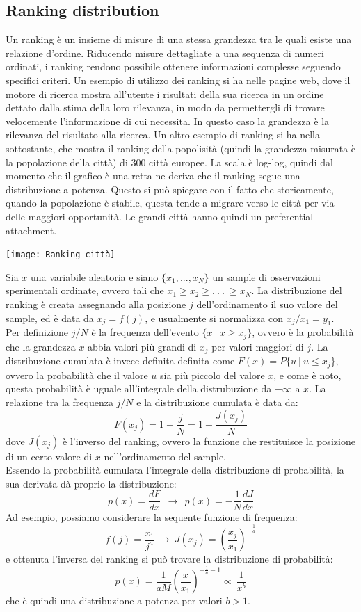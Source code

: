 \documentclass[12pt]{article}
\begin{document}
\subsection{Ranking distribution} 
Un ranking è un insieme di misure di una stessa grandezza tra le quali esiste una relazione d'ordine. Riducendo misure dettagliate a una sequenza di numeri ordinati, i ranking rendono possibile ottenere informazioni complesse seguendo specifici criteri. Un esempio di utilizzo dei ranking si ha nelle pagine web, dove il motore di ricerca mostra all'utente i risultati della sua ricerca in un ordine dettato dalla stima della loro rilevanza, in modo da permettergli di trovare velocemente l'informazione di cui necessita. In questo caso la grandezza è la rilevanza del risultato alla ricerca.
Un altro esempio di ranking si ha nella sottostante, che mostra il ranking della popolisità (quindi la grandezza misurata è la popolazione della città) di 300 città europee. La scala è log-log, quindi dal momento che il grafico è una retta ne deriva che il ranking segue una distribuzione a potenza. Questo si può spiegare con il fatto che storicamente, quando la popolazione è stabile, questa tende a migrare verso le città per via delle maggiori opportunità. Le grandi città hanno quindi un preferential attachment. 
\begin{center}
	\texttt{[image: Ranking città]}
\end{center}
Sia $x$ una variabile aleatoria e siano $\{x_1, . . . , x_N \}$ un sample di osservazioni sperimentali ordinate, ovvero tali che $x_1 \geq x_2 \geq . \ . \ . \ \geq x_N$. La distribuzione del ranking è creata assegnando alla posizione $j$ dell'ordinamento il suo valore del sample, ed è data da $x_j = f(j)$, e usualmente si normalizza con $x_j/x_1 = y_1$. \\
Per definizione $j/N$ è la frequenza dell'evento $\{x \ | \ x \geq x_j\}$, ovvero è la probabilità che la grandezza $x$ abbia valori più grandi di $x_j$ per valori maggiori di $j$. La distribuzione cumulata è invece definita definita come $F(x) = P\{u \ | \ u \leq x_j\}$, ovvero la probabilità che il valore $u$ sia più piccolo del valore $x$, e come è noto, questa probabilità è uguale all'integrale della distrubuzione da $-\infty$ a $x$. La relazione tra la frequenza $j/N$ e la distribuzione cumulata è data da:
$$
	F(x_j) = 1 - \frac{j}{N} = 1 - \frac{J(x_j)}{N}
$$
dove $J(x_j)$ è l'inverso del ranking, ovvero la funzione che restituisce la posizione di un certo valore di $x$ nell'ordinamento del sample. \\
Essendo la probabilità cumulata l'integrale della distribuzione di probabilità, la sua derivata dà proprio la distribuzione:
$$
	p(x) = \frac{dF}{dx} \ \ \longrightarrow \ \ p(x) = -\frac{1}{N} \frac{dJ}{dx}
$$
Ad esempio, possiamo considerare la sequente funzione di frequenza: 
$$
	f(j) = \dfrac{x_1}{j^a} \ \rightarrow \ J(x_j) = \left(\dfrac{x_j}{x_1}\right)^{-\frac{1}{a}}
$$
e ottenuta l'inversa del ranking si può trovare la distribuzione di probabilità:
$$
	p(x) = \frac{1}{aM}\left(\frac{x}{x_1}\right)^{-\frac{1}{a}-1} \propto \ \frac{1}{x^b}
$$
che è quindi una distribuzione a potenza per valori $b>1$.
\end{document}
